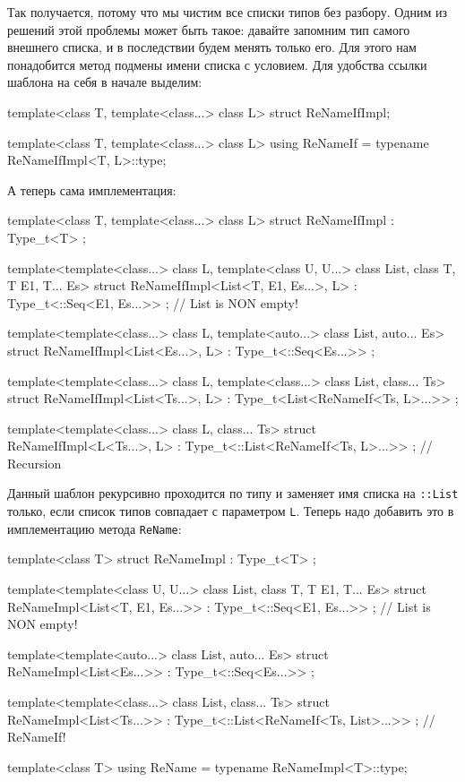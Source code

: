 Так получается, потому что мы чистим все списки типов без разбору.
Одним из решений этой проблемы может быть такое: давайте запомним тип самого внешнего списка, и в последствии будем менять только его.
Для этого нам понадобится метод подмены имени списка с условием.
Для удобства ссылки шаблона на себя в  начале выделим:
\begin{cppcode}
template<class T, template<class...> class L>
struct ReNameIfImpl;

template<class T, template<class...> class L>
using ReNameIf = typename ReNameIfImpl<T, L>::type;
\end{cppcode}
А теперь сама имплементация:
\begin{cppcode}
template<class T, template<class...> class L>
struct ReNameIfImpl : Type_t<T> {};

template<template<class...> class L, template<class U, U...> class List, class T, T E1, T... Es>
struct ReNameIfImpl<List<T, E1, Es...>, L> : Type_t<::Seq<E1, Es...>> {}; // List is NON empty!

template<template<class...> class L, template<auto...> class List, auto... Es>
struct ReNameIfImpl<List<Es...>, L> : Type_t<::Seq<Es...>> {};

template<template<class...> class L, template<class...> class List, class... Ts>
struct ReNameIfImpl<List<Ts...>, L> : Type_t<List<ReNameIf<Ts, L>...>> {};

template<template<class...> class L, class... Ts>
struct ReNameIfImpl<L<Ts...>, L> : Type_t<::List<ReNameIf<Ts, L>...>> {}; // Recursion
\end{cppcode}
Данный шаблон рекурсивно проходится по типу и заменяет имя списка на \verb"::List" только, если список типов совпадает с параметром \verb"L".
Теперь надо добавить это в имплементацию метода \verb"ReName":
\begin{cppcode}
template<class T>
struct ReNameImpl : Type_t<T> {};

template<template<class U, U...> class List, class T, T E1, T... Es>
struct ReNameImpl<List<T, E1, Es...>> : Type_t<::Seq<E1, Es...>> {}; // List is NON empty!

template<template<auto...> class List, auto... Es>
struct ReNameImpl<List<Es...>> : Type_t<::Seq<Es...>> {};

template<template<class...> class List, class... Ts>
struct ReNameImpl<List<Ts...>> : Type_t<::List<ReNameIf<Ts, List>...>> {}; // ReNameIf!

template<class T>
using ReName = typename ReNameImpl<T>::type;
\end{cppcode}
